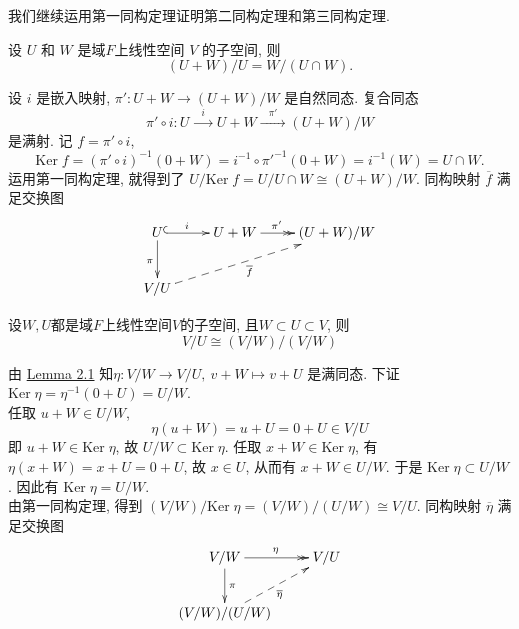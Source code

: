 \documentclass[color=green,mathpazo,titlestyle=hang]{elegantbook}
\begin{document}
我们继续运用第一同构定理证明第二同构定理和第三同构定理.

\begin{newthem}
	
	设 $U$ 和 $W$ 是域$F$上线性空间 $V$ 的子空间, 则
	\[
	(U+W)/U=W/(U\cap W).
	\]
	
\end{newthem}

\begin{newproof}
	设 $i$ 是嵌入映射, $\pi':U+W\rightarrow (U+W)/W$ 是自然同态. 复合同态
	\[\pi'\circ i:U\xrightarrow{\;\;\; i\;\;\;}U+W\xrightarrow{\;\;\;\pi'\;\;\;}(U+W)/W
	\]
	是满射. 记 $f= \pi'\circ i$,
	\[
	\mathrm{Ker}\;f=(\pi'\circ i)^{-1}(0+W)= i^{-1}\circ\pi'^{-1}(0+W)=i^{-1}(W)=U\cap W.
	\]
	运用第一同构定理, 就得到了 $U/\mathrm{Ker}\;f =U/U\cap W\cong(U+W)/W$. 同构映射 $\overline{f}$ 满足交换图
	\[\xymatrix{
		U\ar[d]_{\pi}\ar@{^{(}->}[r]^{i\quad\ } & U+W\ar@{>>}[r]^{\pi'\ \quad} & (U+W)/W\\
		V/U \ar@{-->}[urr]_{\overline{f}} &  
	}\]
\end{newproof}

\begin{newthem}
	
	设$W,U$都是域$F$上线性空间$V$的子空间, 且$W\subset U\subset V$, 则
	\[
	V/U\cong (V/W)/(V/W)
	\]
	
\end{newthem}

\begin{newproof}
	由 \hyperlink{Lemma 2.1}{Lemma 2.1} 知$\eta:V/W\longrightarrow V/U,\ 
	v+W\longmapsto v+U$ 是满同态. 下证 $\mathrm{Ker}\;\eta=\eta^{-1}(0+U)=U/W$.\\
	任取 $u+W\in U/W$,
	\[
	\eta(u+W)=u+U=0+U\in V/U
	\]
	即 $u+W\in\mathrm{Ker}\;\eta$, 故 $U/W\subset\mathrm{Ker}\;\eta$.
	任取 $x+W\in \mathrm{Ker}\;\eta$, 有 $\eta(x+W)=x+U=0+U$, 故 $x\in U$, 从而有 $x+W\in U/W$. 于是 $\mathrm{Ker}\;\eta\subset U/W$. 因此有 $\mathrm{Ker}\;\eta=U/W$.\\
	由第一同构定理, 得到 $(V/W)/\mathrm{Ker}\;\eta =(V/W)/(U/W)\cong V/U$. 同构映射 $\overline{\eta}$ 满足交换图
	\[\xymatrix{
		V/W\ar@{>>}[r]^{\eta}\ar[d]^{\pi} & V/U\\
		(V/W)/(U/W) \ar@{-->}[ur]_{\overline{\eta}} 
	}\]
\end{newproof}





\end{document}
